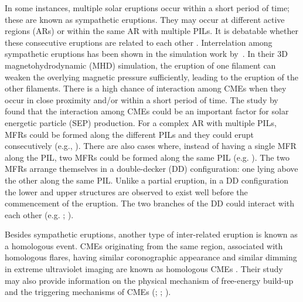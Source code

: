\documentclass{aastex62}
\begin{document}
In some instances, multiple solar eruptions occur within a short period of time; these are known as sympathetic eruptions. They may occur at different active regions (ARs) or within the same AR with multiple PILs. It is debatable whether these consecutive eruptions are related to each other \citep{Biesecker_and_Thompson_2000}. Interrelation among sympathetic eruptions has been shown in the simulation work by~\citet{Torok_etal_2011}. In their 3D magnetohydrodynamic (MHD) simulation, the eruption of one filament can weaken the overlying magnetic pressure sufficiently, leading to the eruption of the other filaments. There is a high chance of interaction among CMEs when they occur in close proximity and/or within a short period of time. The study by \citet{Gopalswamy_etal_2002} found that the interaction among CMEs could be an important factor for solar energetic particle (SEP) production. For a complex AR with multiple PILs, MFRs could be formed along the different PILs and they could erupt consecutively (e.g., \citealt{Chintzoglou_etal_2015}). There are also cases where, instead of having a single MFR along the PIL, two MFRs could be formed along the same PIL (e.g. \citealt{Liu_etal_2012}). The two MFRs arrange themselves in a double-decker (DD) configuration: one lying above the other along the same PIL. Unlike a partial eruption, in a DD configuration the lower and upper structures are observed to exist well before the commencement of the eruption. The two branches of the DD could interact with each other (e.g. \citealt{Liu_etal_2012}; \citealt{Zhu_etal_2015} ).

Besides sympathetic eruptions, another type of inter-related eruption is known as a homologous event.  CMEs originating from the same region, associated with homologous flares, having similar coronographic appearance and similar dimming in extreme ultraviolet imaging are known as homologous CMEs \citep{Zhang_and_Wang_2002}. Their study may also provide information on the physical mechanism of free-energy build-up and the triggering mechanisms of CMEs (\citealt{Nitta_and_Hudson_2001}; \citealt{Zhang_and_Wang_2002}; \citealt{Vemareddy_2017}). 
\end{document}
